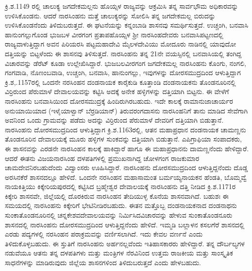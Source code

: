 ಕ್ರಿ.ಶ.1149 ರಲ್ಲಿ ಚಾಲುಕ್ಯ ಜಗದೇಕಮಲ್ಲನು ಹೊಯ್ಸಳ ರಾಜ್ಯವನ್ನು ಆಕ್ರಮಿಸಿ ತನ್ನ ಸಾರ್ವಭೌಮ ಅಧಿಕಾರವನ್ನು ಉಳಿಸಿಕೊಂಡನು. ಆದರೆ ನಾರಸಿಂಹನು ಮತ್ತೆ ಚಾಲುಕ್ಯರನ್ನು ಸೋಲಿಸಿ ತನ್ನ ಜಗದೇಕಮಲ್ಲ ಬಿರುದನ್ನು ಉಳಿಸಿಕೊಂಡನೆಂದು ತಿಳಿದುಬರುತ್ತದೆ. ಈ ಘಟನೆಯನ್ನು ಕನ್ನಂಬಾಡಿ ಶಾಸನವು ಸಮರ್ಥಿಸುತ್ತದೆ. ಉಚ್ಚಂಗಿ, ಬನವಾಸಿ ಹಾನುಂಗಲ್ಲುಗೊಂಡ ಭುಜಬಳ ವೀರಗಂಗ ಪ್ರತಾಪಹೊಯ್ಸಳ ಶ‍್ರೀ ನಾರಸಿಂಹದೇವರು ಬನವಾಸಿಪಟ್ಟಣದಲ್ಲಿ ರಾಜ್ಯವಾಳುತ್ತಿದ್ದಾಗ ಅವನ ಪಿರಿಯರಸಿ ಪಟ್ಟಮಹಾದೇವಿ ಮೈಲಳದೇವಿಯು ಮೋದೂರು ನಾಡಿನಲ್ಲಿ ಯಾವುದೋ ದತ್ತಿಯನ್ನು ಬಿಟ್ಟಳೆಂದು ಈ ಶಾಸನವು ತಿಳಿಸುತ್ತದೆ. ನಾರಸಿಂಹನು ತನ್ನ 21ನೇ ವಯಸ್ಸಿನಲ್ಲಿ ಬನವಾಸಿಯಲ್ಲಿ ತಂಗಿದ್ದ ವಿಚಾರವನ್ನು ಡೆರೆಟ್​ ಕೂಡಾ ಉಲ್ಲೇಖಿಸಿದ್ದಾರೆ. ಭುಜಬಲವೀರಗಂಗ ಜಗದೇಕಮಲ್ಲ ನಾರಸಿಂಹನು ಕೊಂಗು, ನಂಗಲಿ, ಗಂಗವಾಡಿ, ನೊಣಂಬವಾಡಿ, ಉಚ್ಚಂಗಿ, ಬನವಾಸಿ, ಹಾನುಂಗಲ್ಲು, ಇವುಗಳನ್ನು ದೋರಸಮುದ್ರದಿಂದ ಆಳುತ್ತಿದ್ದಾಗ ಕ್ರಿ.ಶ,.1157ರಲ್ಲಿ ಒಂದನೇ ನರಸಿಂಹನ ದಂಡನಾಯಕ ಕಾರೈಕುಡಿ ಕೂತ್ತಾಂಡಿ ದಂಡನಾಯಕನು ತೊಂಡನೂರಿನಲ್ಲಿ ವಿರ್ರಿರುಂದ ಪೆರುಮಾಳೆ ದೇವಾಲಯವನ್ನು ಕಟ್ಟಿಸಿ ಅದಕ್ಕೆ ಅನೇಕ ಹಳ್ಳಿಗಳನ್ನು ದತ್ತಿಯಾಗಿ ಬಿಟ್ಟನು. ಈ ವೇಳೆಗೆ ನಾರಸಿಂಹನು ಬನವಾಸಿಯಿಂದ ದೋರಸಮುದ್ರಕ್ಕೆ ಹಿಂದಿರುಗಿರಬಹುದು. ಇದೇ ಕಾಲಕ್ಕೆ ರಾಮಾನುಜಾಚಾರ್ಯರ ಅನುಯಾಯಿಯಾದ (ಇಳೈಯಾಳ್ವಾನ್​ ಬೆರ್ರಡಿಯಾನ್​) ತಿರುವರಂಗದಾಸನು ನಾರಸಿಂಹನಿಗೆ ತಾನು ಮಾಡಿದ ಸೇವೆಗಾಗಿ ಅವನಿಂದ ಒಂದು ಗ್ರಾಮವನ್ನು ಪಡೆದು ಅದನ್ನು ವಿರ್ರಿರುಂದ ಪೆರುಮಾಳೆ ದೇವರಿಗೆ ದತ್ತಿಯಾಗಿ ಬಿಡುತ್ತಾನೆ. ನಾರಸಿಂಹನು ದೋರಸಮುದ್ರದಿಂದ ಆಳುತ್ತಿದ್ದಾಗ ಕ್ರಿ.ಶ.1163ರಲ್ಲಿ, ಆತನ ಮಹಾಪ್ರಧಾನ ದಂಡನಾಯಕ ಚಾಮಣ್ಣನು ತೊಂಡನೂರಿನ ದೇವಾಲಯಕ್ಕೆ ಮೂರು ಹಳ್ಳಿಗಳ ಸುಂಕವನ್ನು ದತ್ತಿಯಾಗಿ ಬಿಡುತ್ತಾನೆ. ಎಪಿಗ್ರಾಫಿಯಾ ಸಂಪಾದಕರು, ಈ ಶಾಸನವನ್ನು ಎರಡನೇ ನಾರಸಿಂಹನ ಕಾಲಕ್ಕೆ ಹಾಕಿದ್ದಾರೆ ಹಾಗೂ ಈ ಮಹಾಪ್ರಧಾನನು ದಾಮಣ್ಣನೆಂದು ಹೇಳಿದ್ದಾರೆ. ಆದರೆ ಈತನು ವಿಜಯನಾರಸಿಂಹ ದಳಪತಿಗಳಲ್ಲಿ ಪ್ರಮುಖನಾಗಿದ್ದ ಚೋಳಗಂಗ ರಾಜಕುಮಾರ ಚಾಮದೇವನಿರಬಹುದೆಂದು ವಿದ್ವಾಂಸರು ಊಹಿಸಿದ್ದಾರೆ. ನಾರಸಿಂಹನು ದೋರಸಮುದ್ರದಿಂದ ಆಳುತ್ತಿದ್ದನೆಂದು ದೊಡ್ಡ ಅರಸಿನಕೆರೆ ಶಾಸನದಲ್ಲೂ ಹೇಳಿದೆ. ಒಂದನೇ ನರಸಿಂಹನ ಮಹಾಸಾಮಂತ ಬರ್ಮಯ್ಯನಾಯಕನ ಹೆಂಡತಿ, ಬೊಮ್ಮವ್ವೆ ನಾಯಕಿತ್ತಿಯು ಕಿಕ್ಕೇರಿಯಪುರದಲ್ಲಿ ಕಟ್ಟಿಸಿದ ಬ್ರಹ್ಮೇಶ್ವರ ದೇವಾಲಯಕ್ಕೆ ನಾರಸಿಂಹನು ದತ್ತಿ ನೀಡಿದ ಕ್ರಿ.ಶ.1171ರ ಕಿಕ್ಕೇರಿ ಶಾಸನವೇ, ಜಿಲ್ಲೆಯಲ್ಲಿ ದೊರಕಿರುವ ನಾರಸಿಂಹನ ತೇದಿಯುಳ್ಳ ಕೊನೆಯ ಶಾಸನವಾಗಿದೆ. ಬಹುಶಃ ಈ ಸಮಯದಲ್ಲಿ ನಾರಸಿಂಹನು ಕಿಕ್ಕೇರಿಗೆ ಭೇಟಿನೀಡಿರಬಹುದು. ಈತನ ಮತ್ತೊಬ್ಬ ದಂಡನಾಯಕನಾದ ದಂಡನಾಥನು ಸುಂಕಾತೊಂಡನೂರಿನಲ್ಲಿ ಚನ್ನಕೇಶವದೇವಾಲಯವನ್ನು ನಿರ್ಮಿಸಿದ\break ವಿಚಾರವನ್ನು ಹೇಳುವ ಸುಂಕಾತೊಂಡನೂರು ಶಾಸನದಲ್ಲಿ ನಾರಸಿಂಹನು ದೋರಸಮುದ್ರದಿಂದ ಆಳುತ್ತಿದ್ದನೆಂದು ಹೇಳಿದೆ. ಇಮ್ಮಡಿ ಬಲ್ಲಾಳನ ಕಸಲಗೆರೆ ಶಾಸನದಲ್ಲಿ ಎರಡು ಪದ್ಯಗಳಲ್ಲಿ ನರಸಿಂಹನ ಪರಾಕ್ರಮವನ್ನು ವರ್ಣಿಸಲಾಗಿದೆ. ಇದು ಕೇವಲ ವರ್ಣನೆ ಎಂದು ತಿಳಿದುಕೊಳ್ಳಬಹುದು. ಈ ಸ್ತುತಿಗೆ ನಾರಸಿಂಹನು ಅರ್ಹನಲ್ಲವೆಂದು ಇತಿಹಾಸಕಾರರು ಹೇಳಿದ್ದಾರೆ. ತನ್ನ ದೌರ್ಬಲ್ಯಗಳ ನಡುವೆಯೂ ಆತನು ತನ್ನ ದಳಪತಿಗಳು ಮತ್ತು ಮಂತ್ರಿಗಳ ನೆರವಿನಿಂದ ಉತ್ತಮ ರಾಜಕೀಯ ಮತ್ತು ಸಾಂಸ್ಕೃತಿಕ ಸಾಧನೆಗಳನ್ನು ಮಾಡಿರುವುದು ಜಿಲ್ಲೆಯ ಶಾಸನಗಳಿಂದ ತಿಳಿದುಬರುತ್ತದೆ ಎಂದು ಹೇಳಬಹುದು.

